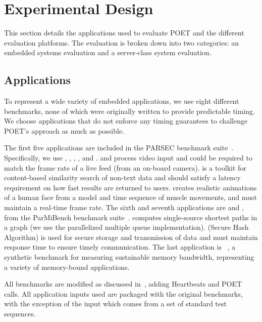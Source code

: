 \section{Experimental Design}
\label{sec:poet-usage}

This section details the applications used to evaluate POET and the different evaluation platforms.
The evaluation is broken down into two categories: an embedded systems evaluation and a server-class system evaluation.


\subsection{Applications}

To represent a wide variety of embedded applications, we use eight different benchmarks, none of which were originally written to provide predictable timing.
We choose applications that do not enforce any timing guarantees to challenge POET's approach as much as possible.

The first five applications are included in the PARSEC benchmark suite~\cite{parsec}.
Specifically, we use , , , , and .
 and  process video input and could be required to match the frame rate of a live feed (\eg from an on-board camera).
 is a toolkit for content-based similarity search of non-text data and should satisfy a latency requirement on how fast results are returned to users.
 creates realistic animations of a human face from a model and time sequence of muscle movements, and must maintain a real-time frame rate.
The sixth and seventh applications are  and , from the ParMiBench benchmark suite~\cite{parmibench}.
 computes single-source shortest paths in a graph (we use the parallelized multiple queue implementation).
 (Secure Hash Algorithm) is used for secure storage and transmission of data and must maintain response time to ensure timely communication.
The last application is ~\cite{stream}, a synthetic benchmark for measuring sustainable memory bandwidth, representing a variety of memory-bound applications.

All benchmarks are modified as discussed in~, adding Heartbeats and POET calls.
All application inputs used are packaged with the original benchmarks, with the exception of the  input which comes from a set of standard test sequences.



